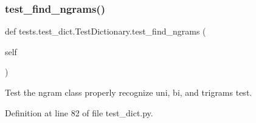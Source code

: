 \subsubsection{\texorpdfstring{test\+\_\+find\+\_\+ngrams()}{test\_find\_ngrams()}}
{\footnotesize\ttfamily def tests.\+test\+\_\+dict.\+Test\+Dictionary.\+test\+\_\+find\+\_\+ngrams (\begin{DoxyParamCaption}\item[{}]{self }\end{DoxyParamCaption})}

\begin{DoxyVerb}Test the ngram class properly recognize uni, bi, and trigrams test.
\end{DoxyVerb}
 

Definition at line 82 of file test\+\_\+dict.\+py.



